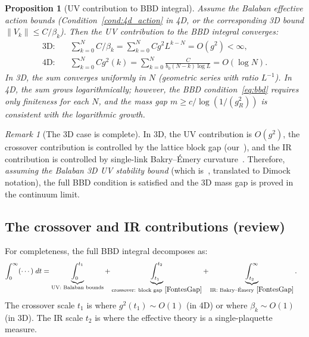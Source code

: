 \documentclass[11pt,a4paper]{article}
\theoremstyle{plain}
\newtheorem{proposition}[theorem]{Proposition}
\theoremstyle{definition}
\theoremstyle{remark}
\newtheorem{remark}[theorem]{Remark}
\begin{document}
\begin{proposition}[UV contribution to BBD integral]
\label{prop:uv_bbd}
Assume the Balaban effective action bounds
(Condition~\ref{cond:4d_action} in 4D,
or the corresponding 3D bound $\|V_k\| \le C/\beta_k$).
Then the UV contribution to the BBD integral converges:
\begin{align}
  \text{3D:} &\quad
  \sum_{k=0}^{N} C / \beta_k =
  \sum_{k=0}^{N} C g^2 L^{k-N} =
  O(g^2) < \infty, \\
  \text{4D:} &\quad
  \sum_{k=0}^{N} C g^2(k) =
  \sum_{k=0}^{N} \frac{C}{b_0(N-k)\log L} =
  O(\log N).
\end{align}
In 3D, the sum converges uniformly in $N$
(geometric series with ratio $L^{-1}$).
In 4D, the sum grows logarithmically; however,
the BBD condition~\eqref{eq:bbd} requires only
finiteness for each $N$, and the mass gap
$m \ge c / \log(1/(g^2_R))$ is consistent
with the logarithmic growth.
\end{proposition}

\begin{remark}[The 3D case is complete]
  In 3D, the UV contribution is $O(g^2)$,
  the crossover contribution is controlled by the
  lattice block gap (our~\cite{FontesGap}), and the
  IR contribution is controlled by single-link
  Bakry--\'Emery curvature~\cite{FontesGap}.
  Therefore, \emph{assuming the Balaban 3D UV stability
  bound} (which is~\cite{Bal85e}, translated to
  Dimock notation), the full BBD condition is
  satisfied and the 3D mass gap is proved
  in the continuum limit.
\end{remark}

\subsection{The crossover and IR contributions (review)}

For completeness, the full BBD integral decomposes as:
\begin{align}
  \int_0^\infty (\cdots)\;dt &=
  \underbrace{\int_0^{t_1}}_{\text{UV: Balaban bounds}}
  + \underbrace{\int_{t_1}^{t_2}}_{\text{crossover:
    block gap}~\cite{FontesGap}}
  + \underbrace{\int_{t_2}^{\infty}}_{\text{IR:
    Bakry--\'Emery}~\cite{FontesGap}}. \label{eq:decomp}
\end{align}
The crossover scale $t_1$ is where $g^2(t_1) \sim O(1)$
(in 4D) or where $\beta_k \sim O(1)$ (in 3D).
The IR scale $t_2$ is where the effective theory
is a single-plaquette measure.
\end{document}
